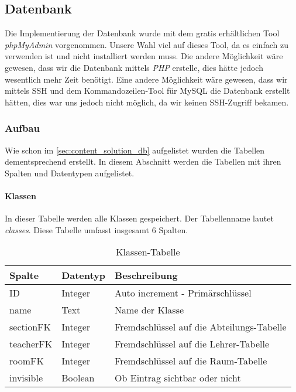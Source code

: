 \subsection{Datenbank}
Die Implementierung der Datenbank wurde mit dem gratis erhältlichen Tool \textit{phpMyAdmin} vorgenommen. Unsere Wahl viel auf dieses Tool, da es einfach zu verwenden ist und nicht installiert werden muss. Die andere Möglichkeit wäre gewesen, dass wir die Datenbank mittels \textit{PHP} erstelle, dies hätte jedoch wesentlich mehr Zeit benötigt. Eine andere Möglichkeit wäre gewesen, dass wir mittels SSH und dem Kommandozeilen-Tool für MySQL die Datenbank erstellt hätten, dies war uns jedoch nicht möglich, da wir keinen SSH-Zugriff bekamen.
\subsubsection{Aufbau}
%
Wie schon im \autoref{sec:content_solution_db} aufgelistet wurden die Tabellen dementsprechend erstellt. In diesem Abschnitt werden die Tabellen mit ihren Spalten und Datentypen aufgelistet.\\

\paragraph{Klassen\\}
In dieser Tabelle werden alle Klassen gespeichert. Der Tabellenname lautet \textit{classes}. Diese Tabelle umfasst insgesamt 6 Spalten.
\begin{table}[H]
\centering
\begin{tabular}{p{2.5 cm}p{2.5 cm}p{10 cm}}
   \toprule
   \textbf{Spalte} & \textbf{Datentyp} & \textbf{Beschreibung} \\
   \midrule
          ID & Integer & Auto increment - Primärschlüssel  \\
          \hline
          name & Text & Name der Klasse \\
          \hline
          sectionFK & Integer & Fremdschlüssel auf die Abteilungs-Tabelle \\
          \hline
          teacherFK & Integer & Fremdschlüssel auf die Lehrer-Tabelle\\
          \hline
          roomFK & Integer & Fremdschlüssel auf die Raum-Tabelle\\
          \hline
          invisible & Boolean & Ob Eintrag sichtbar oder nicht\\
   \bottomrule
\end{tabular}
\caption{Klassen-Tabelle}
\end{table}


